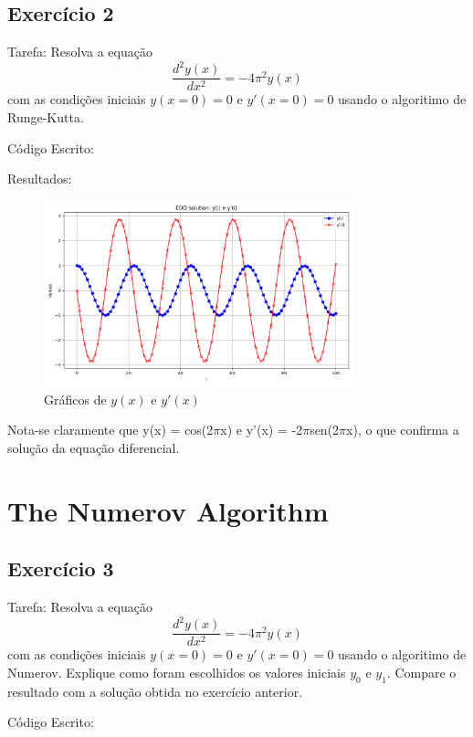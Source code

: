 \documentclass[12pt, a4paper]{article} %
\begin{document}
    \subsection{Exerc\'icio 2}

        Tarefa: Resolva a equa\c{c}\~ao
        \begin{equation*}
            \frac{d^{2}y(x)}{dx^{2}} = -4\pi^{2}y(x)
        \end{equation*}
        com as condi\c{c}\~oes iniciais $y(x=0) = 0$ e $y'(x=0) = 0$ usando o algoritimo de Runge-Kutta.

        C\'odigo Escrito:
        

        Resultados:
        \begin{figure}[H]
            \centering
            \includegraphics[width=0.8\textwidth]{../images/results-ex-2.png}
            \caption{Gr\'aficos de $y(x)$ e $y'(x)$}
        \end{figure}

        Nota-se claramente que y(x) = cos(2$\pi$x) e y'(x) = -2$\pi$sen(2$\pi$x), o que confirma a solu\c{c}\~ao da equa\c{c}\~ao diferencial.
        
\section{The Numerov Algorithm}

    \subsection{Exerc\'icio 3}

        Tarefa: Resolva a equa\c{c}\~ao
        \begin{equation*}
            \frac{d^{2}y(x)}{dx^{2}} = -4\pi^{2}y(x)
        \end{equation*}
        com as condi\c{c}\~oes iniciais $y(x=0) = 0$ e $y'(x=0) = 0$ usando o algoritimo de Numerov. Explique como foram escolhidos os valores iniciais $y_{0}$ e $y_{1}$. Compare o resultado com a solu\c{c}\~ao obtida no exerc\'icio anterior.

        C\'odigo Escrito:

        
\end{document}
